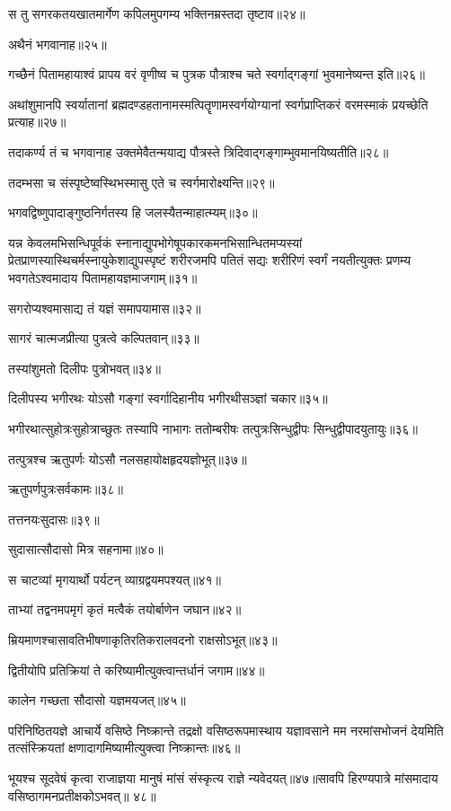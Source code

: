 स तु सगरकतयखातमार्गेण कपिलमुपगम्य भक्तिनम्रस्तदा तृष्टाव॥२४॥

अथैनं भगवानाह॥२५॥

गच्छैनं पितामहायाश्वं प्रापय वरं वृणीष्व च पुत्रक पौत्राश्च चते स्वर्गाद्गङ्गां भुवमानेष्यन्त
इति॥२६॥

अथांशुमानपि स्वर्यातानां ब्रह्मदण्डहतानामस्मत्पितॄणामस्वर्गयोग्यानां स्वर्गप्राप्तिकरं
वरमस्माकं प्रयच्छेति प्रत्याह॥२७॥

तदाकर्ण्य तं च भगवानाह उक्तमेवैतन्मयाद्य पौत्रस्ते त्रिदिवाद्गङ्गाम्भुवमानयिष्यतीति॥२८॥

तदम्भसा च संस्पृष्टेष्वस्थिभस्मासु एते च स्वर्गमारोक्ष्यन्ति॥२९॥

भगवद्विष्णुपादाङ्गुष्ठनिर्गतस्य हि जलस्यैतन्माहात्म्यम्॥३०॥

यन्न केवलमभिसन्धिपूर्वकं स्नानाद्युपभोगेषूपकारकमनभिसान्धितमप्यस्यां
प्रेतप्राणस्यास्थिचर्मस्नायुकेशाद्युपस्पृष्टं शरीरजमपि पतितं सद्यः शरीरिणं स्वर्गं नयतीत्युक्तः
प्रणम्य भवगतेऽश्वमादाय पितामहायज्ञमाजगाम्॥३१॥

सगरोप्यश्वमासाद्य तं यज्ञं समापयामास॥३२॥

सागरं चात्मजप्रीत्या पुत्रत्वे कल्पितवान्॥३३॥

तस्यांशुमतो दिलीपः पुत्रोभवत्॥३४॥

दिलीपस्य भगीरथः योऽसौ गङ्गां स्वर्गादिहानीय भगीरथीसञ्ज्ञां चकार॥३५॥

भगीरथात्सुहोत्रःसुहोत्राच्छुतः तस्यापि नाभागः ततोम्बरीषः तत्पुत्रःसिन्धुद्वीपः
सिन्धुद्वीपादयुतायुः॥३६॥

तत्पुत्रश्च ऋतुपर्णः योऽसौ नलसहायोक्षहृदयज्ञोभूत्॥३७॥

ऋतुपर्णपुत्रःसर्वकामः॥३८॥

तत्तनयःसुदासः॥३९॥

सुदासात्सौदासो मित्र सहनामा॥४०॥

स चाटव्यां मृगयार्थो पर्यटन् व्याग्रद्वयमपश्यत्॥४१॥

ताभ्यां तद्वनमपमृगं कृतं मत्वैकं तयोर्बाणेन जघान॥४२॥

म्रियमाणश्चासावतिभीषणाकृतिरतिकरालवदनो राक्षसोऽभूत्॥४३॥

द्वितीयोपि प्रतिक्रियां ते करिष्यामीत्युक्त्वान्तर्धानं जगाम॥४४॥

कालेन गच्छता सौदासो यज्ञमयजत्॥४५॥

परिनिष्ठितयज्ञे आचार्ये वसिष्ठे निष्क्रान्ते तद्रक्षो वसिष्ठरूपमास्थाय यज्ञावसाने मम
नरमांसभोजनं देयमिति तत्संस्क्रियतां क्षणादागमिष्यामीत्युक्त्वा निष्क्रान्तः॥४६॥

भूयश्च सूदवेषं कृत्वा राजाज्ञया मानुषं मांसं संस्कृत्य राज्ञे न्यवेदयत्॥४७॥सावपि
हिरण्यपात्रे मांसमादाय वसिष्ठागमनप्रतीक्षकोऽभवत्॥ ४८॥

